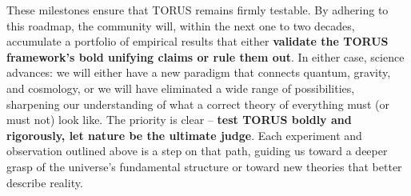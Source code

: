 \documentclass[]{article}
\begin{document}
These milestones ensure that TORUS remains firmly testable. By adhering
to this roadmap, the community will, within the next one to two decades,
accumulate a portfolio of empirical results that either \textbf{validate
the TORUS framework's bold unifying claims or rule them out}. In either
case, science advances: we will either have a new paradigm that connects
quantum, gravity, and cosmology, or we will have eliminated a wide range
of possibilities, sharpening our understanding of what a correct theory
of everything must (or must not) look like. The priority is clear --
\textbf{test TORUS boldly and rigorously, let nature be the ultimate
judge}. Each experiment and observation outlined above is a step on that
path, guiding us toward a deeper grasp of the universe's fundamental
structure or toward new theories that better describe reality.
\end{document}
